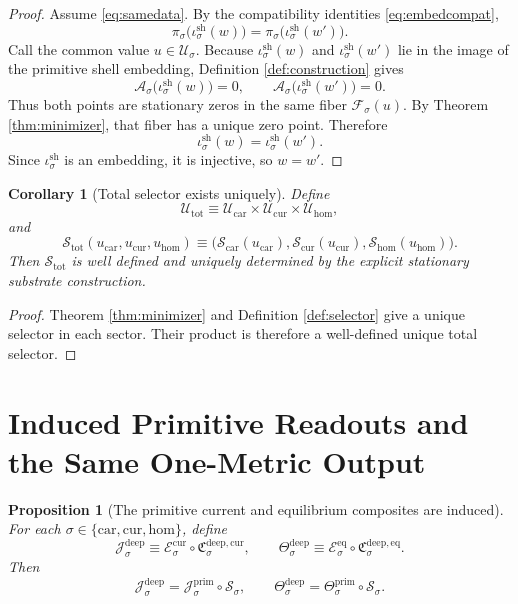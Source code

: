 \documentclass[11pt]{article}
\newcommand{\Car}{\mathrm{car}}
\newcommand{\Cur}{\mathrm{cur}}
\newcommand{\Hom}{\mathrm{hom}}
\newcommand{\CurrentExtract}[1]{\mathscr E_{#1}^{\mathrm{cur}}}
\newcommand{\EqExtract}[1]{\mathscr E_{#1}^{\mathrm{eq}}}
\newcommand{\PrimCurrent}[1]{\mathcal J_{#1}^{\mathrm{prim}}}
\newcommand{\PrimTheta}[1]{\Theta_{#1}^{\mathrm{prim}}}
\newcommand{\DataProj}[1]{\pi_{#1}}
\newcommand{\Fiber}[1]{\mathcal F_{#1}}
\newcommand{\ShellEmbed}[1]{\iota_{#1}^{\mathrm{sh}}}
\newcommand{\StationaryFunctional}[1]{\mathscr A_{#1}}
\newcommand{\DeepSpace}[1]{\mathcal U_{#1}}
\newcommand{\DeepCurrentCarrier}[1]{\mathfrak C_{#1}^{\mathrm{deep,cur}}}
\newcommand{\DeepEqCarrier}[1]{\mathfrak C_{#1}^{\mathrm{deep,eq}}}
\newcommand{\ChainSelect}[1]{\mathcal S_{#1}}
\newcommand{\DeepCurrent}[1]{\mathcal J_{#1}^{\mathrm{deep}}}
\newcommand{\DeepTheta}[1]{\Theta_{#1}^{\mathrm{deep}}}
\newcommand{\DeepShell}{\mathcal U_{\mathrm{tot}}}
\newcommand{\ChainSelectTriple}{\mathcal S_{\mathrm{tot}}}
\newtheorem{proposition}{Proposition}
\newtheorem{corollary}{Corollary}
\begin{document}
\begin{proof}
Assume \eqref{eq:samedata}. By the compatibility identities \eqref{eq:embedcompat},
\[
\DataProj{\sigma}\bigl(\ShellEmbed{\sigma}(w)\bigr)
=
\DataProj{\sigma}\bigl(\ShellEmbed{\sigma}(w')\bigr).
\]
Call the common value \(u\in\DeepSpace{\sigma}\). Because \(\ShellEmbed{\sigma}(w)\) and \(\ShellEmbed{\sigma}(w')\) lie in the image of the primitive shell embedding, Definition \ref{def:construction} gives
\[
\StationaryFunctional{\sigma}\bigl(\ShellEmbed{\sigma}(w)\bigr)=0,
\qquad
\StationaryFunctional{\sigma}\bigl(\ShellEmbed{\sigma}(w')\bigr)=0.
\]
Thus both points are stationary zeros in the same fiber \(\Fiber{\sigma}(u)\). By Theorem \ref{thm:minimizer}, that fiber has a unique zero point. Therefore
\[
\ShellEmbed{\sigma}(w)=\ShellEmbed{\sigma}(w').
\]
Since \(\ShellEmbed{\sigma}\) is an embedding, it is injective, so \(w=w'\).
\end{proof}

\begin{corollary}[Total selector exists uniquely]
\label{cor:totalselector}
Define
\[
\DeepShell
\equiv
\DeepSpace{\Car}\times\DeepSpace{\Cur}\times\DeepSpace{\Hom},
\]
and
\[
\ChainSelectTriple(u_{\Car},u_{\Cur},u_{\Hom})
\equiv
\bigl(
\ChainSelect{\Car}(u_{\Car}),
\ChainSelect{\Cur}(u_{\Cur}),
\ChainSelect{\Hom}(u_{\Hom})
\bigr).
\]
Then \(\ChainSelectTriple\) is well defined and uniquely determined by the explicit stationary substrate construction.
\end{corollary}

\begin{proof}
Theorem \ref{thm:minimizer} and Definition \ref{def:selector} give a unique selector in each sector. Their product is therefore a well-defined unique total selector.
\end{proof}

\section{Induced Primitive Readouts and the Same One-Metric Output}

\begin{proposition}[The primitive current and equilibrium composites are induced]
\label{prop:readouts}
For each \(\sigma\in\{\Car,\Cur,\Hom\}\), define
\[
\DeepCurrent{\sigma}
\equiv
\CurrentExtract{\sigma}\circ \DeepCurrentCarrier{\sigma},
\qquad
\DeepTheta{\sigma}
\equiv
\EqExtract{\sigma}\circ \DeepEqCarrier{\sigma}.
\]
Then
\begin{equation}
\DeepCurrent{\sigma}
=
\PrimCurrent{\sigma}\circ \ChainSelect{\sigma},
\qquad
\DeepTheta{\sigma}
=
\PrimTheta{\sigma}\circ \ChainSelect{\sigma}.
\label{eq:readoutpullback}
\end{equation}
\end{proposition}
\end{document}
